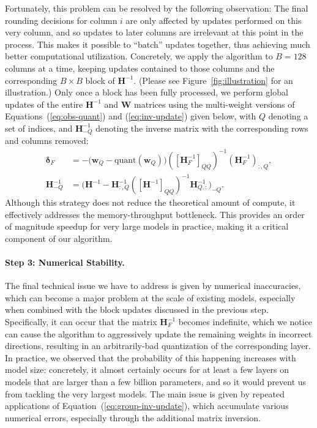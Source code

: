 Fortunately, this problem can be resolved by the following observation: The final rounding decisions for column $i$ are only affected by updates performed on this very column, and so updates to later columns are irrelevant at this point in the process. This makes it possible to ``batch'' updates together, thus achieving much better computational utilization. Concretely, we apply the algorithm to $B = 128$ columns at a time, keeping updates contained to those columns and the corresponding $B \times B$ block of $\mathbf{H}^{-1}$. (Please see Figure~\ref{fig:illustration} for an illustration.)  Only once a block has been fully processed, we perform global updates of the entire $\mathbf{H}^{-1}$ and $\mathbf{W}$ matrices using the multi-weight versions of Equations~(\ref{eq:obs-quant}) and (\ref{eq:inv-update}) given below, with $Q$ denoting a set of indices, and $\mathbf{H}_{-Q}^{-1}$ denoting the inverse matrix with the corresponding rows and columns removed: 
\begin{align}
    \boldsymbol{\delta}_F &= -\Big(\mathbf{w}_Q - \text{quant}(\mathbf{w}_Q)\Big)([\mathbf{H}_F^{-1}]_{QQ})^{-1} (\mathbf{H}_F^{-1})_{:, Q}, \\ 
    \mathbf{H}_{-Q}^{-1} &= \Big(\mathbf{H}^{-1} - \mathbf{H}^{-1}_{:, Q} ([\mathbf{H}^{-1}]_{QQ})^{-1} \mathbf{H}^{-1}_{Q, :} \Big)_{-Q}. \label{eq:group-inv-update}
\end{align}
Although this strategy does not reduce the theoretical amount of compute, it effectively addresses the memory-throughput bottleneck. This provides an order of magnitude speedup for very large models in practice, making it a critical component of our algorithm.

\paragraph{Step 3: Numerical Stability.}
The final technical issue we have to address is given by numerical inaccuracies, which can become a major problem at the scale of existing models, especially when combined with the block updates discussed in the previous step.  
Specifically, it can occur that the matrix $\mathbf{H}_F^{-1}$ becomes indefinite, which we notice can cause the algorithm to aggressively update the remaining weights in incorrect directions, resulting in an arbitrarily-bad quantization of the corresponding layer.
In practice, we observed that the probability of this happening increases with model size: concretely, it almost certainly occurs for at least a few layers on models that are larger than a few billion parameters, and so it would prevent us from tackling the very largest models.  
The main issue is given by repeated applications of Equation~(\ref{eq:group-inv-update}), which accumulate various numerical errors, especially through the additional matrix inversion.

